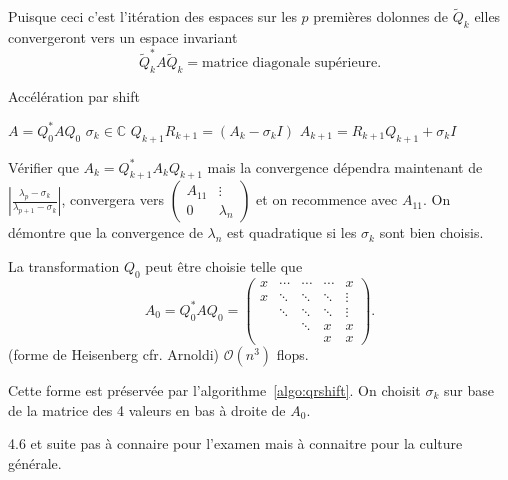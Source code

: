 \documentclass[11pt,a4paper]{article}
\newcommand{\C}{\mathbb{C}}
\theoremstyle{definition}
\newcommand{\bigoh}{\mathcal{O}}
\begin{document}
Puisque ceci c'est l'itération des espaces sur les $p$ premières dolonnes de $\tilde{Q}_k$ elles convergeront vers un espace invariant
$$\tilde{Q}_k^*A\tilde{Q}_k = \text{matrice diagonale supérieure}.$$

\begin{algorithm}
  \caption{Accélération par shift}
  \label{algo:qrshift}
  \begin{algorithmic}
    \STATE $A = Q_0^*AQ_0$
    \STATE $\sigma_k \in \C$
    \STATE $Q_{k+1}R_{k+1} = (A_k - \sigma_k I)$
    \STATE $A_{k+1} = R_{k+1}Q_{k+1} + \sigma_k I$
    \ENDFOR
  \end{algorithmic}
\end{algorithm}

Vérifier que $A_k = Q_{k+1}^* A_k Q_{k+1}$ mais la convergence dépendra maintenant de
$\left|\frac{\lambda_p-\sigma_k}{\lambda_{p+1}-\sigma_k}\right|$, convergera vers
$\begin{pmatrix}
  A_{11} & \vdots\\
  0 & \lambda_n
\end{pmatrix}$
et on recommence avec $A_{11}$.
On démontre que la convergence de $\lambda_n$ est quadratique si les $\sigma_k$ sont bien
choisis.

La transformation $Q_0$ peut être choisie telle que
$$A_0 = Q_0^*AQ_0 =
\begin{pmatrix}
  x & \cdots & \cdots & \cdots & x\\
  x & \ddots & \ddots & \ddots & \vdots\\
    & \ddots & \ddots & \ddots & \vdots\\
    &        & \ddots & x      & x\\
    &        &        & x      & x
\end{pmatrix}.$$
(forme de Heisenberg cfr. Arnoldi) $\bigoh(n^3)$ flops.

Cette forme est préservée par l'algorithme~\ref{algo:qrshift}.
On choisit $\sigma_k$ sur base de la matrice des 4 valeurs en bas à droite de $A_0$.

4.6 et suite pas à connaire pour l'examen mais à connaitre pour la culture générale.
\end{document}
